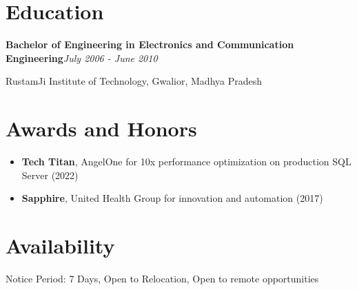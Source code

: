 \documentclass[10pt,a4paper]{article}
\begin{document}
\section{Education}
\noindent\textbf{Bachelor of Engineering in Electronics and Communication Engineering}\hfill \textit{July 2006 - June 2010}

RustamJi Institute of Technology, Gwalior, Madhya Pradesh

\section{Awards and Honors}
\begin{itemize}
  \item \textbf{Tech Titan}, AngelOne for 10x performance optimization on production SQL Server (2022)
  \item \textbf{Sapphire}, United Health Group for innovation and automation (2017)
\end{itemize}

\section{Availability}
Notice Period: 7 Days, Open to Relocation, Open to remote opportunities
\end{document}
